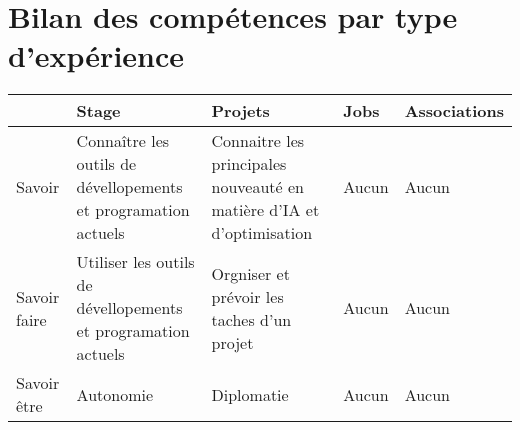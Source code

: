 \section{Bilan des compétences par type d'expérience}

\begin{tabularx}{15cm}{|X|X|X|X|X|}
\hline
\rowcolor{color1}
 & Stage & Projets & Jobs & Associations\\
\hline
Savoir & Connaître les outils de  dévellopements et programation actuels & Connaitre les principales nouveauté en matière d'IA et d'optimisation & Aucun & Aucun\\
\hline
Savoir faire & Utiliser les outils de  dévellopements et programation actuels & Orgniser et prévoir les taches d'un projet & Aucun & Aucun\\
\hline
Savoir être & Autonomie & Diplomatie & Aucun & Aucun\\
\hline
\end{tabularx}
